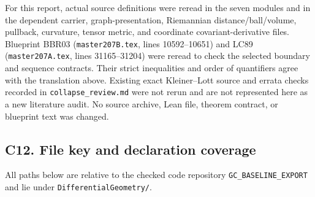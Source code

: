\documentclass[
  letterpaper,
  11pt]{article}
\begin{document}
For this report, actual source definitions were reread in the seven
modules and in the dependent carrier, graph-presentation, Riemannian
distance/ball/volume, pullback, curvature, tensor metric, and coordinate
covariant-derivative files. Blueprint BBR03
({\small\texttt{master207B.\allowbreak{}tex}}, lines 10592--10651) and
LC89 ({\small\texttt{master207A.\allowbreak{}tex}}, lines 31165--31204)
were reread to check the selected boundary and sequence contracts. Their
strict inequalities and order of quantifiers agree with the translation
above. Existing exact Kleiner--Lott source and errata checks recorded in
{\small\texttt{collapse\_\allowbreak{}review.\allowbreak{}md}} were not
rerun and are not represented here as a new literature audit. No source
archive, Lean file, theorem contract, or blueprint text was changed.

\subsection{C12. File key and declaration
coverage}\label{collapse-files}

All paths below are relative to the checked code repository
{\small\texttt{GC\_\allowbreak{}BASELINE\_\allowbreak{}EXPORT}} and lie
under {\small\texttt{Differential\allowbreak{}Geometry/\allowbreak{}}}.
\end{document}
